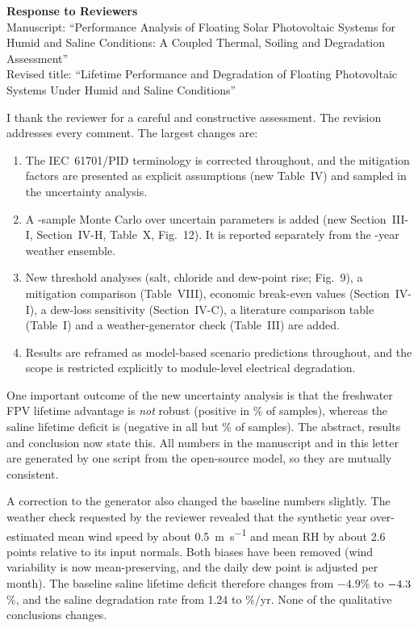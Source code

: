 \documentclass[11pt]{article}
\begin{document}
\begin{center}
{\Large\bfseries Response to Reviewers}\\[4pt]
Manuscript: ``Performance Analysis of Floating Solar Photovoltaic Systems for Humid and Saline Conditions: A Coupled
Thermal, Soiling and Degradation Assessment''\\
Revised title: ``Lifetime Performance and Degradation of Floating Photovoltaic Systems Under Humid and Saline
Conditions''
\end{center}

I thank the reviewer for a careful and constructive assessment. The revision addresses every comment. The largest
changes are:
\begin{enumerate}[nosep]
\item The IEC~61701/PID terminology is corrected throughout, and the mitigation factors are presented as explicit
assumptions (new Table~IV) and sampled in the uncertainty analysis.
\item A \NMC-sample Monte Carlo over \NParams{} uncertain parameters is added (new Section~III-I, Section~IV-H, Table~X,
Fig.~12). It is reported separately from the \NSeeds-year weather ensemble.
\item New threshold analyses (salt, chloride and dew-point rise; Fig.~9), a mitigation comparison (Table~VIII), economic
break-even values (Section~IV-I), a dew-loss sensitivity (Section~IV-C), a literature comparison table (Table~I) and a
weather-generator check (Table~III) are added.
\item Results are reframed as model-based scenario predictions throughout, and the scope is restricted explicitly to
module-level electrical degradation.
\end{enumerate}
One important outcome of the new uncertainty analysis is that the freshwater FPV lifetime advantage is \emph{not}
robust (positive in \MCLifePosF\% of samples), whereas the saline lifetime deficit is (negative in all but
\MCLifePosS\% of samples). The abstract, results and conclusion now state this. All numbers in the manuscript and in this
letter are generated by one script from the open-source model, so they are mutually consistent.

A correction to the generator also changed the baseline numbers slightly. The weather check requested by the reviewer
revealed that the synthetic year over-estimated mean wind speed by about \SI{0.5}{\metre\per\second} and mean RH by about
2.6 points relative to its input normals. Both biases have been removed (wind variability is now mean-preserving, and
the daily dew point is adjusted per month). The baseline saline lifetime deficit therefore changes from $-4.9$\% to
$-4.3$\%, and the saline degradation rate from 1.24 to \DegTotS\%/yr. None of the qualitative conclusions changes.
\end{document}
